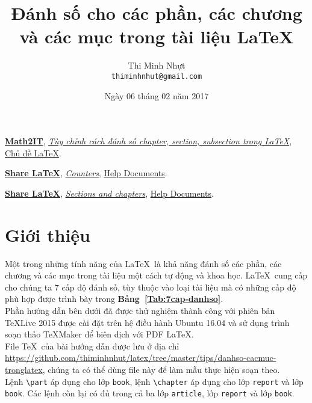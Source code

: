 \documentclass[12pt,a4paper]{article}
\title{\bfseries \huge Đánh số cho các phần, các chương và các mục trong tài liệu \LaTeX}
\author{\Large Thi Minh Nhựt \bigskip \\  \Large \texttt{thiminhnhut@gmail.com}}
\date{\Large Ngày 06 tháng 02 năm 2017}
\newcommand{\tab}[1]{\textbf{Bảng~#1}}
\begin{document}
\maketitle
\tableofcontents

\begin{thebibliography}{99}
   \href{http://math2it.com/}{\textbf{Math2IT}}, \href{https://goo.gl/HuiPpu}{\textit{Tùy chỉnh cách đánh số chapter, section, subsection trong \LaTeX}}, \href{http://math2it.com/category/latex/}{Chủ đề \LaTeX}.

   \href{https://www.sharelatex.com}{\textbf{Share LaTeX}}, \href{https://goo.gl/weJlVt}{\emph{Counters}}, \href{https://www.sharelatex.com/learn}{Help Documents}.

   \href{https://www.sharelatex.com}{\textbf{Share LaTeX}}, \href{https://goo.gl/e5ncGK}{\emph{Sections and chapters}}, \href{https://www.sharelatex.com/learn}{Help Documents}.
\end{thebibliography}

\newpage
\section{Giới thiệu}
Một trong những tính năng của \LaTeX\ là khả năng đánh số các phần, các chương và các mục trong tài liệu một cách tự động và khoa học. \LaTeX\ cung cấp cho chúng ta 7 cấp độ đánh số, tùy thuộc vào loại tài liệu mà có những cấp độ phù hợp được trình bày trong \tab{\ref{Tab:7cap-danhso}}.\\

Phần hướng dẫn bên dưới đã được thử nghiệm thành công với phiên bản \TeX Live 2015 được cài đặt trên hệ điều hành Ubuntu 16.04 và sử dụng trình soạn thảo \TeX Maker để biên dịch với PDF \LaTeX. \\

File \TeX\ của bài hướng dẫn được lưu ở địa chỉ \url{https://github.com/thiminhnhut/latex/tree/master/tips/danhso-cacmuc-tronglatex}, chúng ta có thể dùng file này để làm mẫu thực hiện soạn theo.\\

Lệnh \Verb|\part| áp dụng cho lớp \Verb|book|, lệnh \Verb|\chapter| áp dụng cho lớp \Verb|report| và lớp \Verb|book|. Các lệnh còn lại có đủ trong cả ba lớp \Verb|article|, lớp \Verb|report| và lớp \Verb|book|.
\end{document}
